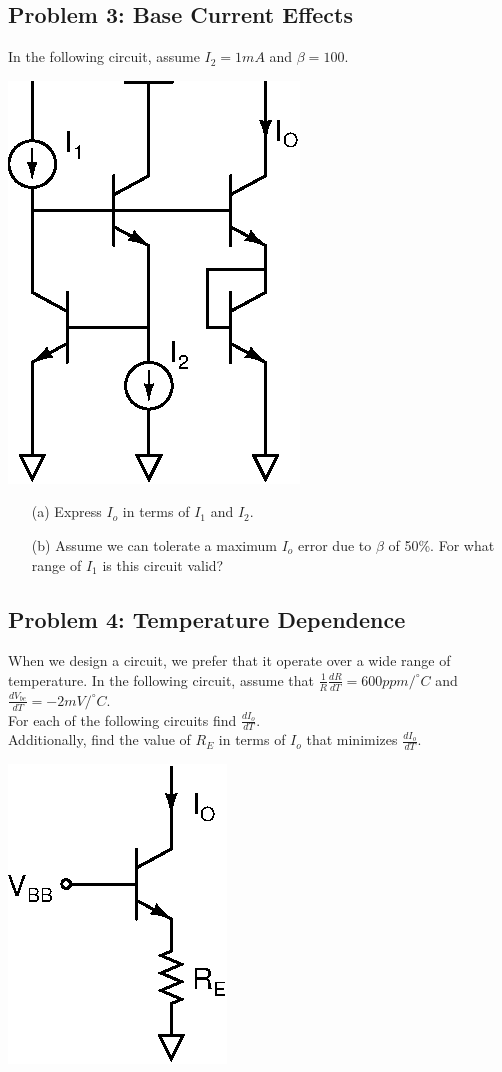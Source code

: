 \documentclass[11pt,twoside]{article}
\begin{document}
\clearpage

\subsection*{Problem 3: Base Current Effects}
In the following circuit, assume $I_2=1mA$ and $\beta=100$.\\
\vspace{1ex}

\begin{center}
\includegraphics[width=.28\textwidth]{sqrtxy.eps}
\end{center}

\begin{enumerate}
	\item[(a)] Express $I_o$ in terms of $I_1$ and $I_2$.
	\item[(b)] Assume we can tolerate a maximum $I_o$ error due to $\beta$ of 50\%.  For what range of $I_1$ is this circuit valid?
\end{enumerate}

\subsection*{Problem 4: Temperature Dependence}
When we design a circuit, we prefer that it operate over a wide range of temperature.
In the following circuit, assume that $\frac{1}{R} \frac{dR}{dT}=600ppm/^{\circ}C$ and $\frac{dV_{be}}{dT}=-2mV/^{\circ}C$. \\
\vspace{1ex}
For each of the following circuits find $\frac{dI_o}{dT}$. \\
\vspace{1ex}
Additionally, find the value of $R_E$ in terms of $I_o$ that minimizes $\frac{dI_o}{dT}$.

\begin{center}
\includegraphics[width=.25\textwidth]{temp-dep.eps}
\end{center}
\end{document}
